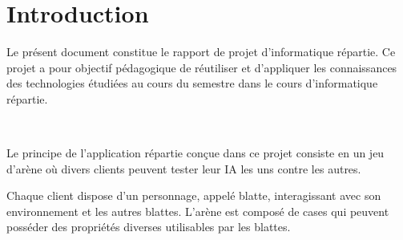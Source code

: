 \chapter*{Introduction}
\thispagestyle{fancy}

Le présent document constitue le rapport de projet d'informatique répartie. Ce projet a pour objectif pédagogique de réutiliser et d'appliquer les connaissances des technologies étudiées au cours du semestre dans le cours d'informatique répartie.

~

Le principe de l'application répartie conçue dans ce projet consiste en un jeu d'arène où divers clients peuvent tester leur IA les uns contre les autres.

Chaque client dispose d'un personnage, appelé \og{}blatte\fg{}, interagissant avec son environnement et les autres blattes. L'arène est composé de cases qui peuvent posséder des propriétés diverses utilisables par les blattes.

